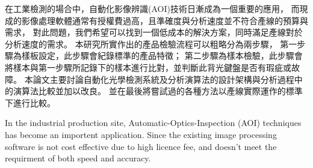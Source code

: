 \begin{abstractzh}
在工業檢測的場合中，自動化影像辨識(AOI)技術日漸成為一個重要的應用，
而現成的影像處理軟體通常有授權費過高，且準確度與分析速度並不符合產線的預算與需求，
對此問題，我們希望可以找到一個低成本的解決方案，同時滿足產線對於分析速度的需求。
本研究所實作出的產品檢驗流程可以粗略分為兩步驟，
第一步驟為樣板設定，此步驟會紀錄標準的產品特徵；
第二步驟為樣本檢驗，此步驟會將樣本與第一步驟所記錄下的樣本進行比對，並判斷此背光鍵盤是否有瑕疵或故障。
本論文主要討論自動化光學檢測系統及分析演算法的設計架構與分析過程中的演算法比較並加以改良。
並在最後將嘗試過的各種方法以產線實際運作的標準下進行比較。

\end{abstractzh}

\begin{abstracten}
In the industrial production site, Automatic-Optics-Inspection (AOI) techniques has become an importent application.
Since the existing image processing software is not cost effective due to high licence fee, 
and doesn't meet the requirment of both speed and accuracy. 
\end{abstracten}